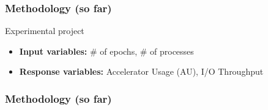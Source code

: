 \documentclass[brazil, bsc, 10pt]{beamer}
\begin{document}
\begin{frame}
	\frametitle{Methodology (so far)}
	\begin{block}{Experimental project}
		\begin{itemize}
			\item \textbf{Input variables:} \# of epochs, \# of processes
			\item \textbf{Response variables:} Accelerator Usage (AU), I/O Throughput
		\end{itemize}
	\end{block}
\end{frame}

\begin{frame}
	\frametitle{Methodology (so far)}
	\begin{table}[h!]
		\centering
		\caption{Experimental setup}
		\label{tab:exp_setup}
		\renewcommand{\arraystretch}{0.7} %
\end{table}
\end{frame}
\end{document}
